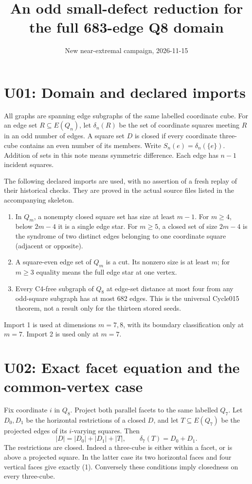 \documentclass{article}
\begin{document}
\title{An odd small-defect reduction for the full 683-edge Q8 domain}
\author{New near-extremal campaign, 2026-11-15}
\maketitle

\section{U01: Domain and declared imports}
All graphs are spanning edge subgraphs of the same labelled coordinate cube.
For an edge set $R\subseteq E(Q_n)$, let $\delta_n(R)$ be the set of coordinate
squares meeting $R$ in an odd number of edges. A square set $D$ is closed if
every coordinate three-cube contains an even number of its members.
Write $S_n(e)=\delta_n(\{e\})$. Addition of sets in this note means symmetric
difference. Each edge has $n-1$ incident squares.

The following declared imports are used, with no assertion of a fresh replay
of their historical checks. They are proved in the actual source files listed
in the accompanying skeleton.
\begin{enumerate}
\item In $Q_m$, a nonempty closed square set has size at least $m-1$.
For $m\ge4$, below $2m-4$ it is a single edge star.
For $m\ge5$, a closed set of size $2m-4$ is the syndrome of two distinct
edges belonging to one coordinate square (adjacent or opposite).
\item A square-even edge set of $Q_m$ is a cut. Its nonzero size is at least
$m$; for $m\ge3$ equality means the full edge star at one vertex.
\item Every C4-free subgraph of $Q_8$ at edge-set distance at most four
from any odd-square subgraph has at most 682 edges. This is the universal
Cycle015 theorem, not a result only for the thirteen stored seeds.
\end{enumerate}
Import 1 is used at dimensions $m=7,8$, with its boundary classification
only at $m=7$. Import 2 is used only at $m=7$.

\section{U02: Exact facet equation and the common-vertex case}
Fix coordinate $i$ in $Q_8$. Project both parallel facets to the same labelled
$Q_7$. Let $D_0,D_1$ be the horizontal restrictions of a closed $D$, and let
$T\subseteq E(Q_7)$ be the projected edges of its $i$-varying squares. Then
\[
 |D|=|D_0|+|D_1|+|T|,\qquad
 \delta_7(T)=D_0+D_1.                                      \tag{1}
\]
The restrictions are closed. Indeed a three-cube is either within a facet,
or is above a projected square. In the latter case its two horizontal faces
and four vertical faces give exactly (1). Conversely these conditions imply
closedness on every three-cube.
\end{document}
